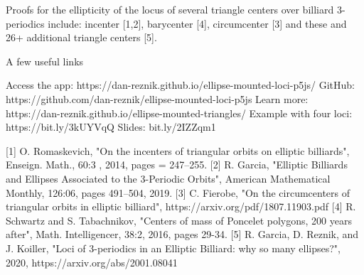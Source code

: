 Proofs for the ellipticity of the locus of several triangle centers over billiard 3-periodics include: incenter [1,2], barycenter [4], circumcenter [3] and these and 26+ additional triangle centers [5].

A few useful links

Access the app: https://dan-reznik.github.io/ellipse-mounted-loci-p5js/
GitHub: https://github.com/dan-reznik/ellipse-mounted-loci-p5js
Learn more: https://dan-reznik.github.io/ellipse-mounted-triangles/
Example with four loci: https://bit.ly/3kUYVqQ
Slides: bit.ly/2IZZqm1

[1] O. Romaskevich, "On the incenters of triangular orbits on elliptic billiards", Enseign. Math., 60:3 , 2014, pages = 247--255.
[2] R. Garcia, "Elliptic Billiards and Ellipses Associated to the 3-Periodic Orbits", American Mathematical Monthly, 126:06, pages 491--504, 2019.
[3] C. Fierobe, "On the circumcenters of triangular orbits in elliptic billiard", https://arxiv.org/pdf/1807.11903.pdf
[4] R. Schwartz and S. Tabachnikov, "Centers of mass of Poncelet polygons, 200 years after",
Math. Intelligencer, 38:2, 2016, pages 29-34. 
[5] R. Garcia, D. Reznik, and J. Koiller, "Loci of 3-periodics in an Elliptic Billiard: why so many ellipses?", 2020, https://arxiv.org/abs/2001.08041